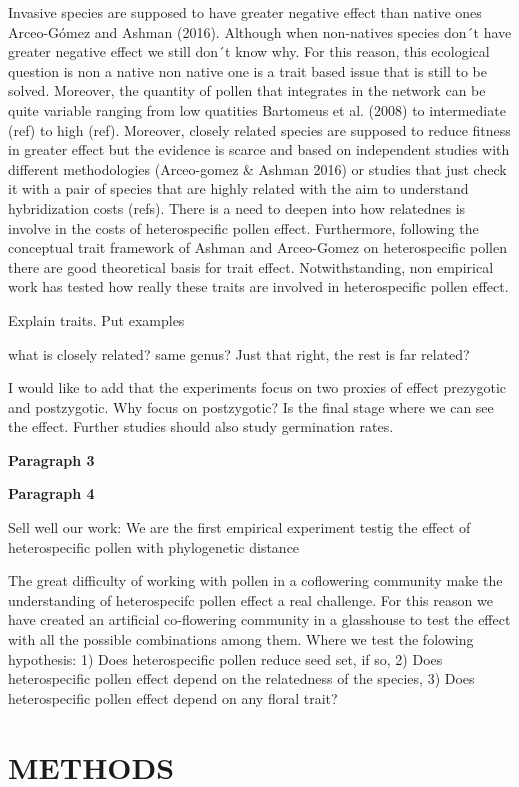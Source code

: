 \documentclass[11pt,a4paper]{article}
\begin{document}
Invasive species are supposed to have greater negative effect than
native ones Arceo-Gómez and Ashman (2016). Although when non-natives
species don´t have greater negative effect we still don´t know why. For
this reason, this ecological question is non a native non native one is
a trait based issue that is still to be solved. Moreover, the quantity
of pollen that integrates in the network can be quite variable ranging
from low quatities Bartomeus et al. (2008) to intermediate (ref) to high
(ref). Moreover, closely related species are supposed to reduce fitness
in greater effect but the evidence is scarce and based on independent
studies with different methodologies (Arceo-gomez \& Ashman 2016) or
studies that just check it with a pair of species that are highly
related with the aim to understand hybridization costs (refs). There is
a need to deepen into how relatednes is involve in the costs of
heterospecific pollen effect. Furthermore, following the conceptual
trait framework of Ashman and Arceo-Gomez on heterospecific pollen there
are good theoretical basis for trait effect. Notwithstanding, non
empirical work has tested how really these traits are involved in
heterospecific pollen effect.

Explain traits. Put examples

what is closely related? same genus? Just that right, the rest is far
related?

I would like to add that the experiments focus on two proxies of effect
prezygotic and postzygotic. Why focus on postzygotic? Is the final stage
where we can see the effect. Further studies should also study
germination rates.

\textbf{Paragraph 3}

\textbf{Paragraph 4}

Sell well our work: We are the first empirical experiment testig the
effect of heterospecific pollen with phylogenetic distance

The great difficulty of working with pollen in a coflowering community
make the understanding of heterospecifc pollen effect a real challenge.
For this reason we have created an artificial co-flowering community in
a glasshouse to test the effect with all the possible combinations among
them. Where we test the folowing hypothesis: 1) Does heterospecific
pollen reduce seed set, if so, 2) Does heterospecific pollen effect
depend on the relatedness of the species, 3) Does heterospecific pollen
effect depend on any floral trait?

\section{METHODS}\label{methods}
\end{document}
